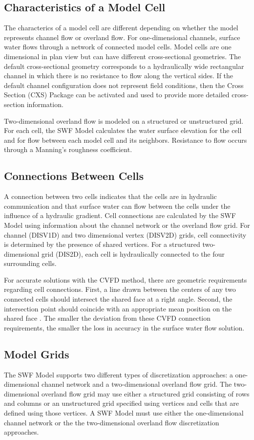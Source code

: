 \documentclass[fleqn]{article}
\begin{document}
\subsection{Characteristics of a Model Cell}
The characterics of a model cell are different depending on whether the model represents channel flow or overland flow.  For one-dimensional channels, surface water flows through a network of connected model cells.  Model cells are one dimensional in plan view but can have different cross-sectional geometries.  The default cross-sectional geometry corresponds to a hydraulically wide rectangular channel in which there is no resistance to flow along the vertical sides.  If the default channel configuration does not represent field conditions, then the Cross Section (CXS) Package can be activated and used to provide more detailed cross-section information.

Two-dimensional overland flow is modeled on a structured or unstructured grid.  For each cell, the SWF Model calculates the water surface elevation for the cell and for flow between each model cell and its neighbors.  Resistance to flow occurs through a Manning's roughness coefficient.

\subsection{Connections Between Cells}
A connection between two cells indicates that the cells are in hydraulic communication and that surface water can flow between the cells under the influence of a hydraulic gradient.  Cell connections are calculated by the SWF Model using information about the channel network or the overland flow grid.  For channel (DISV1D) and two dimensional vertex (DISV2D) grids, cell connectivity is determined by the presence of shared vertices.  For a structured two-dimensional grid (DIS2D), each cell is hydraulically connected to the four surrounding cells.  

For accurate solutions with the CVFD method, there are geometric requirements regarding cell connections.  First, a line drawn between the centers of any two connected cells should intersect the shared face at a right angle. Second, the intersection point should coincide with an appropriate mean position on the shared face \cite{narasimhan1976integrated}.  The smaller the deviation from these CVFD connection requirements, the smaller the loss in accuracy in the surface water flow solution. 

\subsection{Model Grids}
The SWF Model supports two different types of discretization approaches: a one-dimensional channel network and a two-dimensional overland flow grid.  The two-dimensional overland flow grid may use either a structured grid consisting of rows and columns or an unstructured grid specified using vertices and cells that are defined using those vertices.  A SWF Model must use either the one-dimensional channel network or the the two-dimensional overland flow discretization approaches.  
\end{document}
